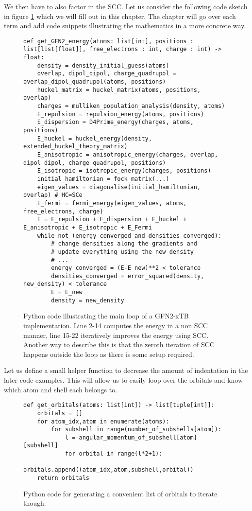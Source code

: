We then have to also factor in the SCC. 
Let us consider the following code sketch in figure \ref{lst:total_energy} which we will fill out in this chapter. The chapter will go over each term and add code snippets illustrating the mathematics in a more concrete way. 
\begin{figure}[H]
\begin{verbatim}
def get_GFN2_energy(atoms: list[int], positions : list[list[float]], free_electrons : int, charge : int) -> float:
    density = density_initial_guess(atoms)
    overlap, dipol_dipol, charge_quadrupol = overlap_dipol_quadrupol(atoms, positions)
    huckel_matrix = huckel_matrix(atoms, positions, overlap)
    charges = mulliken_population_analysis(density, atoms)
    E_repulsion = repulsion_energy(atoms, positions)
    E_dispersion = D4Prime_energy(charges, atoms, positions)
    E_huckel = huckel_energy(density, extended_huckel_theory_matrix)
    E_anisotropic = anisotropic_energy(charges, overlap, dipol_dipol, charge_quadrupol, positions)
    E_isotropic = isotropic_energy(charges, positions)
    initial_hamiltonian = fock_matrix(...)
    eigen_values = diagonalise(initial_hamiltonian, overlap) # HC=SCe 
    E_fermi = fermi_energy(eigen_values, atoms, free_electrons, charge)
    E = E_repulsion + E_dispersion + E_huckel + E_anisotropic + E_isotropic + E_Fermi
    while not (energy_converged and densities_converged):
        # change densities along the gradients and 
        # update everything using the new density
        # ...
        energy_converged = (E-E_new)**2 < tolerance
        densities_converged = error_squared(density, new_density) < tolerance
        E = E_new
        density = new_density
\end{verbatim}
\caption{Python code illustrating the main loop of a GFN2-xTB implementation.
Line 2-14 computes the energy in a non SCC manner, line 15-22 iteratively improves the energy using SCC.
Another way to describe this is that the zeroth iteration of SCC happens outside the loop as there is some setup required. 
}
    \label{lst:total_energy}
\end{figure}
Let us define a small helper function to decrease the amount of indentation in the later code examples. This will allow us to easily loop over the orbitals and know which atom and shell each belongs to. 
\begin{figure}[H]
\begin{verbatim}
def get_orbitals(atoms: list[int]) -> list[tuple[int]]:
    orbitals = []
    for atom_idx,atom in enumerate(atoms):
        for subshell in range(number_of_subshells[atom]):
            l = angular_momentum_of_subshell[atom][subshell] 
            for orbital in range(l*2+1):
                orbitals.append((atom_idx,atom,subshell,orbital))
    return orbitals
\end{verbatim}
\caption{Python code for generating a convenient list of orbitals to iterate though. }
\end{figure}

